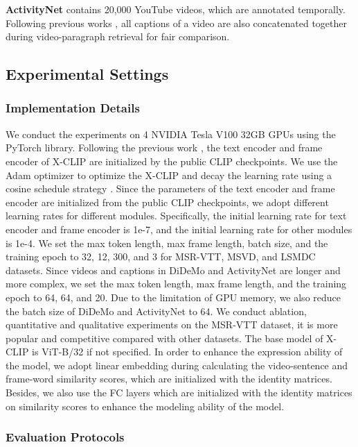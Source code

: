 \documentclass[sigconf]{acmart}
\begin{document}
\noindent\textbf{ActivityNet} \cite{caba2015activitynet} contains 20,000 YouTube videos, which are annotated temporally. Following previous works \cite{luo2021clip4clip,sun2019learning,gabeur2020multi}, all captions of a video are also concatenated together during video-paragraph retrieval for fair comparison.




\subsection{Experimental Settings}


\subsubsection{Implementation Details}
We conduct the experiments on 4 NVIDIA Tesla V100 32GB GPUs using the PyTorch library. Following the previous work \cite{luo2021clip4clip}, the text encoder and frame encoder of X-CLIP are initialized by the public CLIP checkpoints.  We use the Adam optimizer \cite{kingma2015adam} to optimize the X-CLIP and decay the learning rate using a cosine schedule strategy \cite{loshchilov2016sgdr}. Since the parameters of the text encoder and frame encoder are initialized from the public CLIP checkpoints, we adopt different learning rates for different modules. Specifically, the initial learning rate for text encoder and frame encoder is 1e-7, and the initial learning rate for other modules is 1e-4. We set the max token length, max frame length, batch size, and the training epoch to 32, 12, 300, and 3 for MSR-VTT, MSVD, and LSMDC datasets. Since videos and captions in DiDeMo and ActivityNet are longer and more complex, we set the max token length, max frame length, and the training epoch to 64, 64, and 20. Due to the limitation of GPU memory, we also reduce the batch size of DiDeMo and ActivityNet to 64. We conduct ablation, quantitative and qualitative experiments on the MSR-VTT dataset, it is more popular and competitive compared with other datasets. The base model of X-CLIP is ViT-B/32 if not specified. In order to enhance the expression ability of the model, we adopt linear embedding during calculating the video-sentence and frame-word similarity scores, which are initialized with the identity matrices. Besides, we also use the FC layers which are initialized with the identity matrices on similarity scores to enhance the modeling ability of the model.


\subsubsection{Evaluation Protocols}
\end{document}
